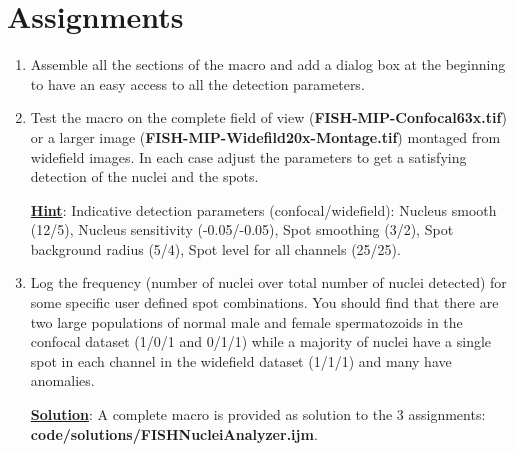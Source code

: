 \section{Assignments}

\begin{enumerate}
\item Assemble all the sections of the macro and add a dialog box at the beginning to have an easy access to all the detection parameters.
 
\item Test the macro on the complete field of view (\textbf{FISH-MIP-Confocal63x.tif}) or a larger image (\textbf{FISH-MIP-Widefild20x-Montage.tif}) montaged from widefield images. In each case adjust the parameters to get a satisfying detection of the nuclei and the spots.

\textbf{\underline{Hint}}: Indicative detection parameters (confocal/widefield): Nucleus smooth (12/5), Nucleus sensitivity (-0.05/-0.05), Spot smoothing (3/2), Spot background radius (5/4), Spot level for all channels (25/25).

\item Log the frequency (number of nuclei over total number of nuclei detected) for some specific user defined spot combinations. You should find that there are two large populations of normal male and female spermatozoids in the confocal dataset (1/0/1 and 0/1/1) while a majority of nuclei have a single spot in each channel in the widefield dataset (1/1/1) and many have anomalies.

\textbf{\underline{Solution}}: A complete macro is provided as solution to the 3 assignments: \textbf{code/solutions/FISHNucleiAnalyzer.ijm}.

\end{enumerate}